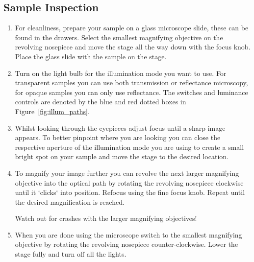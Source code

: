 \documentclass[a4paper]{scrartcl}
\begin{document}
\subsection*{Sample Inspection}
\begin{enumerate}
	\item For cleanliness, prepare your sample on a glass microscope slide, these can be found in the drawers. Select the smallest magnifying objective on the revolving nosepiece and move the stage all the way down with the focus knob.\\
		Place the glass slide with the sample on the stage.
	\item Turn on the light bulb for the illumination mode you want to use. For transparent samples you can use both transmission or reflectance microscopy, for opaque samples you can only use reflectance. The switches and luminance controls are denoted by the blue and red dotted boxes in Figure~\ref{fig:illum_paths}.
	\item Whilst looking through the eyepieces adjust focus until a sharp image appears. To better pinpoint where you are looking you can close the respective aperture of the illumination mode you are using to create a small bright spot on your sample and move the stage to the desired location.
	\item To magnify your image further you can revolve the next larger magnifying objective into the optical path by rotating the revolving nosepiece clockwise until it `clicks` into position. Refocus using the fine focus knob. Repeat until the desired magnification is reached.\\
		\colorbox{warning!30}{\parbox{\linewidth}{Watch out for crashes with the larger magnifying objectives!}}
	\item When you are done using the microscope switch to the smallest magnifying objective by rotating the revolving nosepiece counter-clockwise. Lower the stage fully and turn off all the lights.
\end{enumerate}
\end{document}

